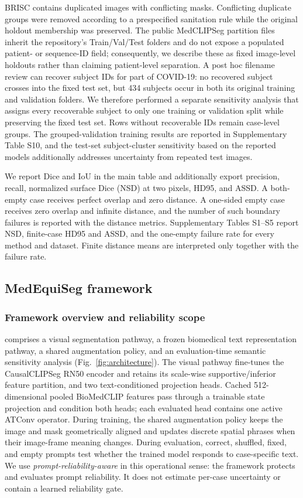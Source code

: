 BRISC contains duplicated images with conflicting masks. Conflicting duplicate
groups were removed according to a prespecified sanitation rule while the
original holdout membership was preserved. The public MedCLIPSeg partition files inherit the repository's
Train/Val/Test folders and do not expose a populated patient- or sequence-ID
field; consequently, we describe these as fixed image-level holdouts rather than
claiming patient-level separation. A post hoc filename review can recover subject
IDs for part of COVID-19: no recovered subject crosses into the fixed test set,
but 434 subjects occur in both its original training and validation folders. We
therefore performed a separate sensitivity analysis that assigns every
recoverable subject to only one training or validation split while preserving the
fixed test set. Rows without recoverable IDs remain case-level groups. The
grouped-validation training results are reported in Supplementary Table S10, and
the test-set subject-cluster sensitivity based on the reported models additionally
addresses uncertainty from repeated test images.

We report Dice and IoU in the main table and additionally export precision,
recall, normalized surface Dice (NSD) at two pixels, HD95, and ASSD. A both-empty
case receives perfect overlap and zero distance. A one-sided empty case receives
zero overlap and infinite distance, and the number of such boundary failures is
reported with the distance metrics. Supplementary Tables S1--S5 report NSD,
finite-case HD95 and ASSD, and the one-empty failure rate for every method and
dataset. Finite distance means are interpreted only together with the failure
rate.

\subsection{MedEquiSeg framework}
\label{sec:method}
\subsubsection{Framework overview and reliability scope}
\methodname{} comprises a visual segmentation pathway, a frozen biomedical text
representation pathway, a shared augmentation policy, and an evaluation-time
semantic sensitivity analysis (Fig.~\ref{fig:architecture}). The visual pathway fine-tunes the
CausalCLIPSeg RN50 encoder and retains its scale-wise supportive/inferior feature
partition, and two text-conditioned projection heads. Cached 512-dimensional
pooled BioMedCLIP features pass through a trainable state projection and condition
both heads; each evaluated head contains one active ATConv operator. During training, the shared augmentation policy
keeps the image and mask geometrically aligned and updates discrete spatial
phrases when their image-frame meaning changes. During evaluation, correct,
shuffled, fixed, and empty prompts test whether the trained model responds to
case-specific text. We use \emph{prompt-reliability-aware} in this operational
sense: the framework protects and evaluates prompt reliability. It does not estimate
per-case uncertainty or contain a learned reliability gate.

